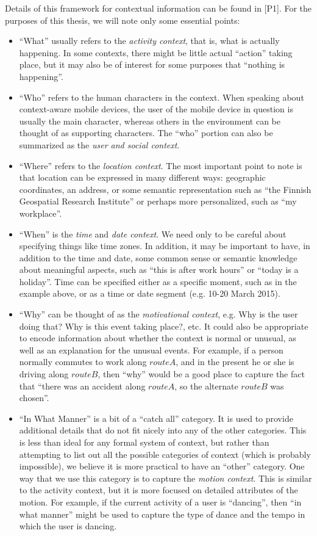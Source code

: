 Details of this framework for contextual information can be found in [P1]. For the purposes of this thesis, we will note only some essential points:
%
\begin{itemize}
\item ``What'' usually refers to the \emph{activity context}, that is, what is actually happening. In some contexts, there might be little actual ``action'' taking place, but it may also be of interest for some purposes that ``nothing is happening''.
% 
\item ``Who'' refers to the human characters in the context. When speaking about context-aware mobile devices, the user of the mobile device in question is usually the main character, whereas others in the environment can be thought of as supporting characters. The ``who'' portion can also be summarized as the \emph{user and social context}. 
%
\item ``Where'' refers to the \emph{location context}. The most important point to note is that location can be expressed in many different ways: geographic coordinates, an address, or some semantic representation such as ``the Finnish Geospatial Research Institute'' or perhaps more personalized, such as ``my workplace''.
%
\item ``When'' is the \emph{time} and \emph{date context}. We need only to be careful about specifying things like time zones. In addition, it may be important to have, in addition to the time and date, some common sense or semantic knowledge about meaningful aspects, such as ``this is after work hours'' or ``today is a holiday''. Time can be specified either as a specific moment, such as in the example above, or as a time or date segment (e.g. 10-20 March 2015).
%
\item ``Why'' can be thought of as the \emph{motivational context}, e.g. Why is the user doing that? Why is this event taking place?, etc. It could also be appropriate to encode information about whether the context is normal or unusual, as well as an explanation for the unusual events. For example, if a person normally commutes to work along $route A$, and in the present he or she is driving along $route B$, then ``why'' would be a good place to capture the fact that ``there was an accident along $route A$, so the alternate $route B$ was chosen''.
%
\item ``In What Manner'' is a bit of a ``catch all'' category. It is used to provide additional details that do not fit nicely into any of the other categories. This is less than ideal for any formal system of context, but rather than attempting to list out all the possible categories of context (which is probably impossible), we believe it is more practical to have an ``other'' category. One way that we use this category is to capture the \emph{motion context}. This is similar to the activity context, but it is more focused on detailed attributes of the motion. For example, if the current activity of a user is ``dancing'', then ``in what manner'' might be used to capture the type of dance and the tempo in which the user is dancing.

\end{itemize}
